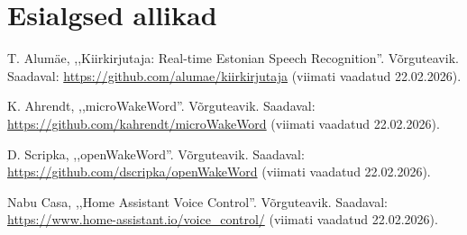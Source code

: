 \documentclass[12pt]{report}
\begin{document}
\chapter{Esialgsed allikad}
\begin{enumerate}[label={[\arabic*]}]
    \item T. Alumäe, ,,Kiirkirjutaja: Real-time Estonian Speech Recognition''. Võrguteavik. Saadaval: \url{https://github.com/alumae/kiirkirjutaja} (viimati vaadatud 22.02.2026).
    \item K. Ahrendt, ,,microWakeWord''. Võrguteavik. Saadaval: \url{https://github.com/kahrendt/microWakeWord} (viimati vaadatud 22.02.2026).
    \item D. Scripka, ,,openWakeWord''. Võrguteavik. Saadaval: \url{https://github.com/dscripka/openWakeWord} (viimati vaadatud 22.02.2026).
    \item Nabu Casa, ,,Home Assistant Voice Control''. Võrguteavik. Saadaval: \url{https://www.home-assistant.io/voice_control/} (viimati vaadatud 22.02.2026).
\end{enumerate}
\end{document}
